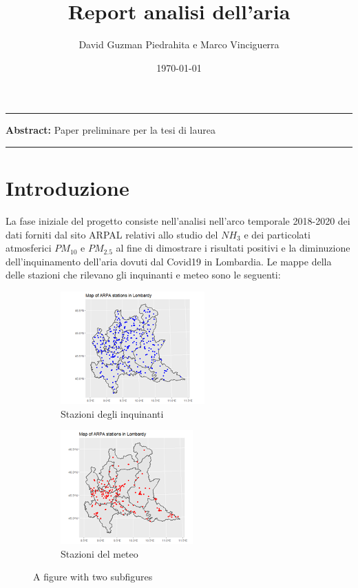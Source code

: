 \documentclass{article}
\title{Report analisi dell'aria}
\author{David Guzman Piedrahita e Marco Vinciguerra}
\date{\today}
\begin{document}
\maketitle

\par\noindent\rule{\textwidth}{0.4pt}
\textbf{Abstract:} Paper preliminare per la tesi di laurea
\par\noindent\rule{\textwidth}{0.4pt}

\section{Introduzione}
La fase iniziale del progetto consiste nell'analisi nell'arco temporale 2018-2020 dei dati 
forniti dal sito ARPAL relativi allo studio del $NH_{3}$ e dei particolati atmosferici $PM_{10}$ e $PM_{2.5}$ al 
fine di dimostrare i risultati positivi e la diminuzione dell'inquinamento dell'aria 
dovuti dal Covid19 in Lombardia. Le mappe della delle stazioni che rilevano gli inquinanti e meteo sono le 
seguenti:
\begin{figure}
    \centering
    \begin{subfigure}{.5\textwidth}
      \centering
      \includegraphics[width=.7\linewidth]{Lpollution.png}
      \caption{Stazioni degli inquinanti}
      \label{fig:sub1}
    \end{subfigure}%
    \begin{subfigure}{.5\textwidth}
      \centering
      \includegraphics[width=.7\linewidth]{Lweather.png}
      \caption{Stazioni del meteo}
      \label{fig:sub2}
    \end{subfigure}
    \caption{A figure with two subfigures}
    \label{fig:test}
    \end{figure}
\end{document}
